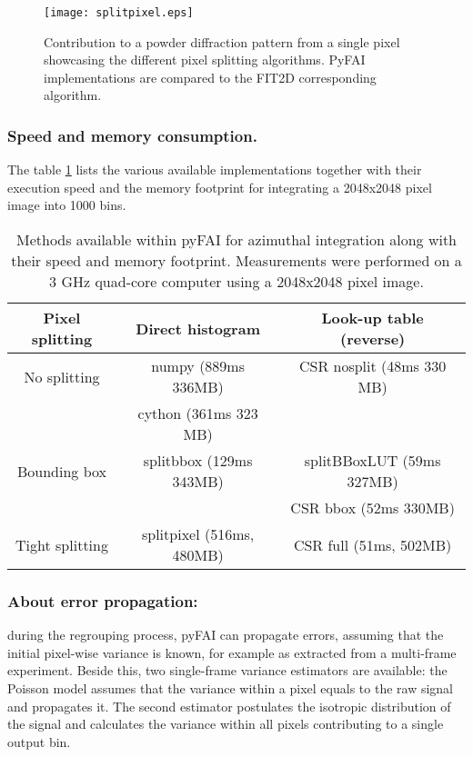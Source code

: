 \documentclass{iucr}
\begin{document}
\begin{figure}
\label{split}
\begin{center}
\texttt{[image: splitpixel.eps]}
\caption{Contribution to a powder diffraction pattern from a single pixel
showcasing the different pixel splitting algorithms. PyFAI implementations are
compared to the FIT2D corresponding algorithm.}
\end{center}
\end{figure}

\subsubsection{Speed and memory consumption.}

The table \ref{table_methods}  lists the various available implementations
together with their execution speed and the memory footprint for integrating a 2048x2048
pixel image into 1000 bins.

\begin{table}
\label{table_methods}
\caption{Methods available within pyFAI for azimuthal integration
along with their speed and memory footprint. 
Measurements were performed on a 3 GHz quad-core
computer using a 2048x2048 pixel image.}
\begin{tabular}[pos]{|c|c|c|}
\hline
Pixel splitting			& Direct histogram 		& Look-up table (reverse) \\
\hline
No splitting          & numpy (889ms 336MB)  &CSR nosplit (48ms 330 MB)\\ 
					  & cython (361ms 323 MB) & \\
\hline
Bounding box          & splitbbox (129ms 343MB) & splitBBoxLUT (59ms 327MB)\\
					&						&	CSR bbox (52ms 330MB) \\
\hline
Tight splitting & splitpixel (516ms, 480MB) &CSR full (51ms, 502MB)\\
\hline
\end{tabular}
\end{table}


\subsubsection{About error propagation:}
during the regrouping process, pyFAI can propagate errors, assuming that the
initial pixel-wise variance is known, for example as extracted from a
multi-frame experiment. Beside this, two single-frame variance estimators are
available: the Poisson model assumes that the variance within a pixel equals to
the raw signal and propagates it. The second estimator postulates the
isotropic distribution of the signal and calculates the variance within all
pixels contributing to a single output bin. 
\end{document}
